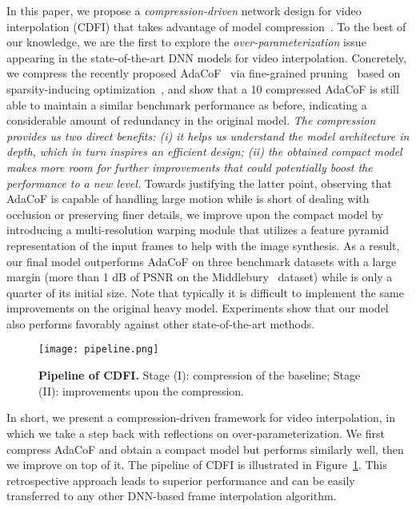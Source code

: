 \documentclass[final]{cvpr}
\begin{document}
In this paper, we propose a \emph{compression-driven} network design for video interpolation (CDFI) that takes advantage of model compression~\cite{bucilu2006model,cheng2017survey,zhu2017prune}. To the best of our knowledge, we are the first to explore the \emph{over-parameterization} issue appearing in the state-of-the-art DNN models for video interpolation. Concretely, we compress the recently proposed \mbox{AdaCoF}~\cite{lee2020adacof} via fine-grained pruning~\cite{zhu2017prune} based on sparsity-inducing optimization~\cite{chen2020orthant}, and show that a 10 compressed \mbox{AdaCoF} is still able to maintain a similar benchmark performance as before, indicating a considerable amount of redundancy in the original model. \emph{The compression provides us two direct benefits: (i) it helps us understand the model architecture in depth, which in turn inspires an efficient design; (ii) the obtained compact model makes more room for further improvements that could potentially boost the performance to a new level.} Towards justifying the latter point, observing that \mbox{AdaCoF} is capable of handling large motion while is short of dealing with occlusion or preserving finer details, we improve upon the compact model by introducing a multi-resolution warping module that utilizes a feature pyramid representation of the input frames
to help with the image synthesis. As a result, our final model outperforms \mbox{AdaCoF} on three benchmark datasets with a large margin (more than 1 dB of PSNR on the Middlebury~\cite{baker2011database} dataset) while is only a quarter of its initial size. Note that typically it is difficult to implement the same improvements on the original heavy model. Experiments show that our model also performs favorably against other state-of-the-art methods. 

\begin{figure}[]
    \centering
    \texttt{[image: pipeline.png]}\hfill
     \caption{\textbf{Pipeline of CDFI.} Stage (I): compression of the baseline; Stage (II): improvements upon the compression.}
    \label{fig:compress}
    \vspace{-.15in}
\end{figure}

In short, we present a {compression-driven} framework for video interpolation, in which we take a step back with reflections on over-parameterization. We first compress \mbox{AdaCoF} and obtain a compact model but performs similarly well, then we  improve on top of it. The pipeline of CDFI is illustrated in Figure~\ref{fig:compress}. This retrospective approach leads to superior performance and can be easily transferred to any other DNN-based frame interpolation algorithm.
\end{document}
